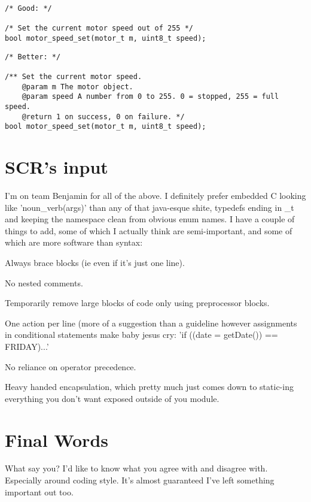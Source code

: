 \documentclass[10pt]{article}
\begin{document}
\begin{lstlisting}[frame=single]
/* Good: */

/* Set the current motor speed out of 255 */
bool motor_speed_set(motor_t m, uint8_t speed);
\end{lstlisting}

\begin{lstlisting}[frame=single]
/* Better: */

/** Set the current motor speed. 
	@param m The motor object.
	@param speed A number from 0 to 255. 0 = stopped, 255 = full speed.
	@return 1 on success, 0 on failure. */
bool motor_speed_set(motor_t m, uint8_t speed);
\end{lstlisting}

\section{SCR's input}
I'm on team Benjamin for all of the above. I definitely prefer embedded C looking like 'noun\_verb(args)' than any of that java-esque shite, typedefs ending in \_t and keeping the namespace clean from obvious enum names. 
I have a couple of things to add, some of which I actually think are semi-important, and some of which are more software than syntax:
\begin{list}{*}{}
	\item Always brace blocks (ie even if it's just one line).
	\item No nested comments.
	\item Temporarily remove large blocks of code only using preprocessor blocks.
	\item One action per line (more of a suggestion than a guideline however assignments in conditional statements make baby jesus cry: 'if ((date = getDate()) == FRIDAY){...}'
	\item No reliance on operator precedence.
	\item Heavy handed encapsulation, which pretty much just comes down to static-ing everything you don't want exposed outside of you module.
\end{list}

\section{Final Words}
What say you? I'd like to know what you agree with and disagree with. Especially around coding style. It's almost guaranteed I've left something important out too.
\end{document}
